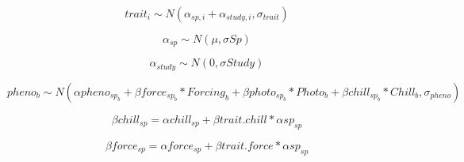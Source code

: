 \documentclass{article}\usepackage[]{graphicx}\usepackage[]{color}
\begin{document}

 

\begin{equation}
\label{TraitsLine_main}
trait_{i} \sim N( \alpha_{sp,i} + \alpha_{study,i},\sigma_{trait}) 
\end{equation}

\begin{equation}
\label{TraitsLine_sp}
\alpha_{sp} \sim N(\mu, \sigma Sp)
\end{equation}

\begin{equation}
\label{TraitsLine_study}
\alpha_{study} \sim N(0, \sigma Study)
\end{equation} 

\begin{equation}
\label{phen_main}
pheno_{b}  \sim N( \alpha pheno_{sp_b} + \beta force_{sp_b} * Forcing_{b} + \beta photo_{sp_b}  * Photo_{b} + \beta chill_{sp_b} * Chill_{b} , \sigma_{pheno} ) 
\end{equation} 

\begin{equation}
\label{betaChillEq}
\beta chill_{sp} = \alpha chill_{sp} + \beta trait.chill * \alpha sp_{sp}
\end{equation} 

\begin{equation}
\label{betaForceEq}
\beta force_{sp} = \alpha force_{sp} + \beta trait.force * \alpha sp_{sp}
\end{equation} 
\end{document}
